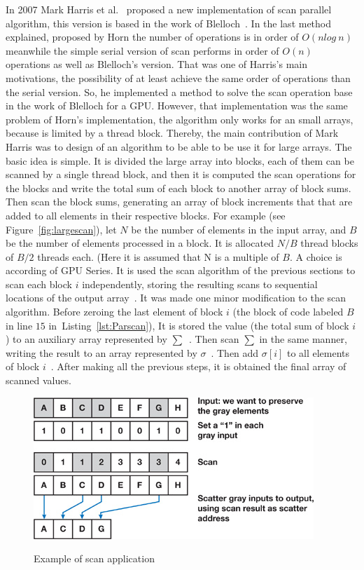 \documentclass[Ingles]{ic-tese-v1}
\newcommand{\rlst}[1]{Listing~\ref{lst:#1}}
\begin{document}
In 2007 Mark Harris et al.~\cite{harris2007parallel} proposed a new implementation of scan parallel algorithm, this version is based in the work of Blelloch~\cite{ScanAsPrimitive}. In the last method explained, proposed by Horn the number of operations is in order of $O(n log\ n)$ meanwhile the simple serial version of scan performs in order of $O(n)$ operations as well as Blelloch's version. That was one of Harris's main motivations, the possibility of at least achieve the same order of operations than the serial version. So, he implemented a method to solve the scan operation base in the work of Blelloch for a GPU. However, that implementation was the same problem of Horn's implementation, the algorithm only works for an small arrays, because is limited by a thread block. Thereby, the main contribution of Mark Harris was to design of an algorithm to be able to be use it for large arrays.
The basic idea is simple. It is divided the large array into blocks, each of them can be scanned by a single thread block, and then it is computed the scan operations for the blocks and write the total sum of each block to another array of block sums. Then scan the block sums, generating an array of block increments that that are added to all elements in their respective blocks. For example (see Figure~\ref{fig:largescan}), let $N$ be the number of elements in the input array, and $B$ be the number of elements processed in a block. It is allocated $N/B$ thread blocks of $B/2$ threads each. (Here it is assumed that N is a multiple of $B$. A choice is according of GPU Series. It is used the scan algorithm of the previous sections to scan each block $i$ independently, storing the resulting scans to sequential locations of the output array~. It was made one minor modification to the scan algorithm. Before zeroing the last element of block $i$ (the block of code labeled $B$ in line $15$ in~\rlst{Parscan}), It is stored the value (the total sum of block $i$) to an auxiliary array represented by $\sum$~. Then scan $\sum$ in the same manner, writing the result to an array represented by $\sigma$~. Then add $\sigma[i]$ to all elements of block $i$~. After making all the previous steps, it is obtained the final array of scanned values. 

\begin{figure}[t]
	\centering
	\caption{Example of scan application}
	\includegraphics[scale=1.0]{images/desireElements.jpg}
	\label{fig:desire}
\end{figure}
\end{document}
